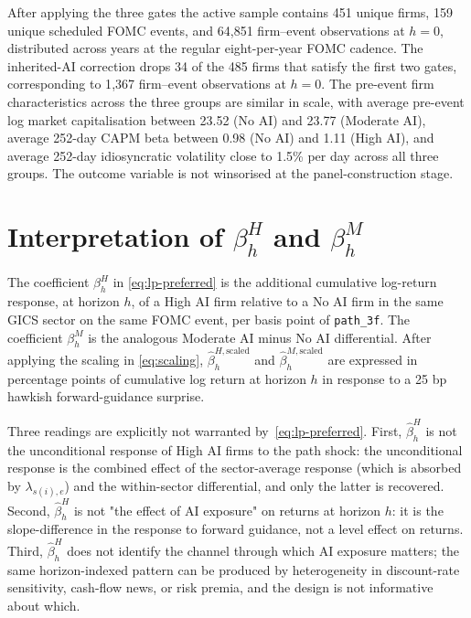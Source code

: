 After applying the three gates the active sample contains 451 unique firms, 159 unique scheduled FOMC events, and 64{,}851 firm--event observations at $h=0$, distributed across years at the regular eight-per-year FOMC cadence. The inherited-AI correction drops 34 of the 485 firms that satisfy the first two gates, corresponding to 1{,}367 firm--event observations at $h=0$. The pre-event firm characteristics across the three groups are similar in scale, with average pre-event log market capitalisation between 23.52 (No AI) and 23.77 (Moderate AI), average 252-day CAPM beta between 0.98 (No AI) and 1.11 (High AI), and average 252-day idiosyncratic volatility close to 1.5\% per day across all three groups. The outcome variable is not winsorised at the panel-construction stage.

\section{Interpretation of \texorpdfstring{$\beta_h^H$}{betaH} and \texorpdfstring{$\beta_h^M$}{betaM}}
\label{sec:emp-interpretation}

The coefficient $\beta_h^H$ in \eqref{eq:lp-preferred} is the additional cumulative log-return response, at horizon $h$, of a High AI firm relative to a No AI firm in the same GICS sector on the same FOMC event, per basis point of \texttt{path\_3f}. The coefficient $\beta_h^M$ is the analogous Moderate AI minus No AI differential. After applying the scaling in \eqref{eq:scaling}, $\hat\beta_h^{H,\text{scaled}}$ and $\hat\beta_h^{M,\text{scaled}}$ are expressed in percentage points of cumulative log return at horizon $h$ in response to a 25 bp hawkish forward-guidance surprise.

Three readings are explicitly not warranted by~\eqref{eq:lp-preferred}. First, $\hat\beta_h^H$ is not the unconditional response of High AI firms to the path shock: the unconditional response is the combined effect of the sector-average response (which is absorbed by $\lambda_{s(i),e}$) and the within-sector differential, and only the latter is recovered. Second, $\hat\beta_h^H$ is not "the effect of AI exposure" on returns at horizon $h$: it is the slope-difference in the response to forward guidance, not a level effect on returns. Third, $\hat\beta_h^H$ does not identify the channel through which AI exposure matters; the same horizon-indexed pattern can be produced by heterogeneity in discount-rate sensitivity, cash-flow news, or risk premia, and the design is not informative about which.

